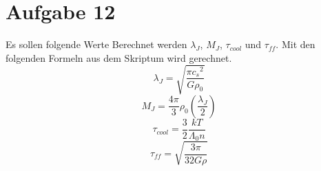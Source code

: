 \section{Aufgabe 12}
Es sollen folgende Werte Berechnet werden $\lambda_J$, $M_J$, $\tau_{cool}$ und $\tau_{ff}$. Mit den folgenden Formeln aus dem Skriptum wird gerechnet.
\begin{equation}
\lambda_{J}=\sqrt{\frac{\pi {c_s}^2}{G \rho_0}}
\end{equation}
\begin{equation}
M_{J}=\frac{4 \pi}{3} \rho_0 \left ( \frac{\lambda_J}{2} \right)
\end{equation}
\begin{equation}
\tau_{cool}=\frac{3}{2} \frac{k T}{\Lambda_0 n}
\end{equation}
\begin{equation}
\tau_{ff}=\sqrt{\frac{3 \pi}{32 G \rho}}
\end{equation}


